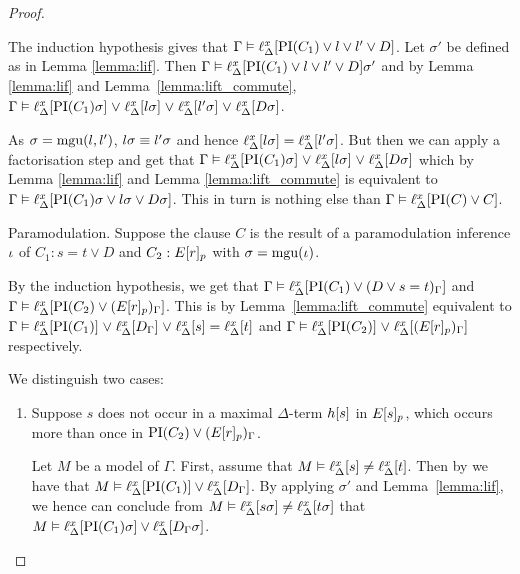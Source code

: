 \begin{proof}
\begin{description}

			The induction hypothesis gives that
			$\Gamma \vDash \ell_{\Delta}^{x}[\operatorname{PI}(C_1) \lor l \lor l' \lor D]$.
			Let $\sigma'$ be defined as in Lemma \ref{lemma:lif}.
			Then $\Gamma \vDash \ell_{\Delta}^{x}[\operatorname{PI}(C_1) \lor l \lor l' \lor D]\sigma'$ and by Lemma \ref{lemma:lif} and Lemma~\ref{lemma:lift_commute},
			$\Gamma \vDash \ell_{\Delta}^{x}[\operatorname{PI}(C_1)\sigma] \;{\lor}\; \ell_{\Delta}^{x}[l\sigma] \;{\lor}\; \ell_{\Delta}^{x}[l'\sigma] \;{\lor}\; \ell_{\Delta}^{x}[D\sigma]$.

			As $\sigma = \operatorname{mgu}(l, l')$, $l\sigma \equiv l'\sigma$ and hence $\ell_{\Delta}^{x}[l\sigma] = \ell_{\Delta}^{x}[l'\sigma]$.
			But then we can apply a factorisation step and get that
			$\Gamma \vDash \ell_{\Delta}^{x}[\operatorname{PI}(C_1)\sigma] \;{\lor}\; \ell_{\Delta}^{x}[l\sigma] \;{\lor}\; \ell_{\Delta}^{x}[D\sigma]$
			which by Lemma \ref{lemma:lif} and Lemma \ref{lemma:lift_commute} is equivalent to 
			$\Gamma \entails\nolinebreak \lifdelta{\PI(C_1)\sigma \lor l\sigma \lor D\sigma}$.
			This in turn is nothing else than $\Gamma \vDash \ell_{\Delta}^{x}[\operatorname{PI}(C) \lor C]$.

		\item{Paramodulation.}
			Suppose the clause $C$ is the result of a paramodulation inference\nolinebreak{} $\iota$ of $C_1: s=t \lor   D$ and $C_2: E{[r]_{p}}$ with $\sigma=\operatorname{mgu}(\iota)$.


			By the induction hypothesis, we get that 
			$\Gamma \vDash \ell_{\Delta}^{x}[\operatorname{PI}(C_1) \lor (D\lor s=t)_\Gamma]$ and 
			$\Gamma \vDash \ell_{\Delta}^{x}[\operatorname{PI}(C_2) \lor (E{[r]_{p}})_\Gamma]$.
			This is by Lemma~\ref{lemma:lift_commute} equivalent to
			\markA{} $\Gamma \vDash \ell_{\Delta}^{x}[\operatorname{PI}(C_1)] \;{\lor}\;\allowbreak \ell_{\Delta}^{x}[D_\Gamma] \;{\lor}\; \ell_{\Delta}^{x}[s] = \ell_{\Delta}^{x}[t]$
			and \markB{} 
			$\Gamma \vDash \ell_{\Delta}^{x}[\operatorname{PI}(C_2)] \;{\lor}\; \ell_{\Delta}^{x}[(E{[r]_{p}})_\Gamma]$ respectively.


			We distinguish two cases:\nopagebreak
			\begin{enumerate}
				\item Suppose $s$ does not occur in a maximal $\Delta$-term $h[s]$ in $E{[s]_{p}}$, which occurs more than once in $\operatorname{PI}(C_2) \lor (E{[r]_{p}})_\Gamma$.
					\label{klehjy}

					Let $M$ be a model of $\Gamma$.
					First, assume that $M \vDash \ell_{\Delta}^{x}[s] \neq \ell_{\Delta}^{x}[t]$.
					Then by \markA{} we have that $M \vDash \ell_{\Delta}^{x}[\operatorname{PI}(C_1)] \lor \ell_{\Delta}^{x}[D_\Gamma]$.
					By applying $\sigma'$ and Lemma~\ref{lemma:lif}, we hence can conclude from 
					$M \vDash \ell_{\Delta}^{x}[s\sigma] \neq \ell_{\Delta}^{x}[t\sigma]$ that 
					$M \vDash \ell_{\Delta}^{x}[\operatorname{PI}(C_1)\sigma] \lor \ell_{\Delta}^{x}[D_\Gamma\sigma]$.



\end{enumerate}
\end{description}
\end{proof}
